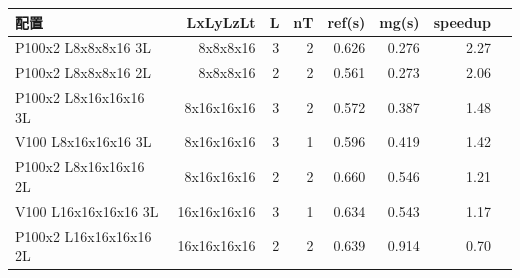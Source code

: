 \begin{tabular}{l|rrrrrrr}
\hline
配置 & LxLyLzLt & L & nT & ref(s) & mg(s) & speedup \\
\hline
P100x2 L8x8x8x16 3L & 8x8x8x16 & 3 & 2 & 0.626 & 0.276 & 2.27 \\
P100x2 L8x8x8x16 2L & 8x8x8x16 & 2 & 2 & 0.561 & 0.273 & 2.06 \\
P100x2 L8x16x16x16 3L & 8x16x16x16 & 3 & 2 & 0.572 & 0.387 & 1.48 \\
V100 L8x16x16x16 3L & 8x16x16x16 & 3 & 1 & 0.596 & 0.419 & 1.42 \\
P100x2 L8x16x16x16 2L & 8x16x16x16 & 2 & 2 & 0.660 & 0.546 & 1.21 \\
V100 L16x16x16x16 3L & 16x16x16x16 & 3 & 1 & 0.634 & 0.543 & 1.17 \\
P100x2 L16x16x16x16 2L & 16x16x16x16 & 2 & 2 & 0.639 & 0.914 & 0.70 \\
\hline
\end{tabular}

